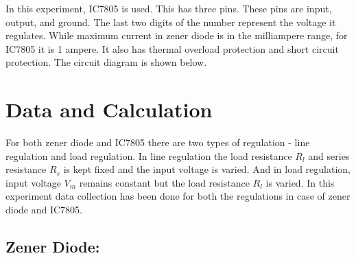 \documentclass[12pt]{article}
\begin{document}
In this experiment, IC7805 is used. This has three pins. These pins are input, output, and ground. The last two digits of the number represent the voltage it regulates. While maximum current in zener diode is in the milliampere range, for IC7805 it is 1 ampere. It also has thermal overload protection and short circuit protection. The circuit diagram is shown below.

\begin{figure}[!ht]
    \centering
    
    \label{fig:my_label}
    \end{figure}
\section{Data and Calculation}
For both zener diode and IC7805 there are two types of regulation - line regulation and load regulation. In line regulation the load resistance $R_l$ and series resistance $R_s$ is kept fixed and the input voltage is varied. And in load regulation, input voltage $V_m$ remains constant but the load resistance $R_l$ is varied. In this experiment data collection has been done for both the regulations in case of zener diode and IC7805.

\subsection{Zener Diode:}
\end{document}
